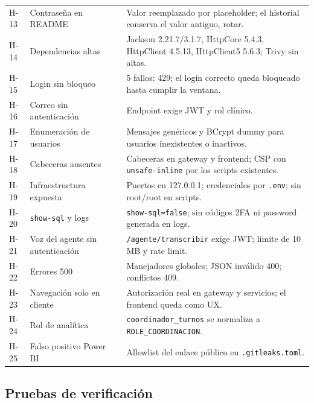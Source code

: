{\begin{longtable}{@{}L{1.0cm}L{5.2cm}L{2.2cm}L{7.0cm}@{}}
H-13 & Contraseña en README &  & Valor reemplazado por placeholder; el historial conserva el valor antiguo, rotar.\\
H-14 & Dependencias altas &  & Jackson 2.21.7/3.1.7, HttpCore 5.4.3, HttpClient 4.5.13, HttpClient5 5.6.3; Trivy sin altas.\\
H-15 & Login sin bloqueo &  & 5 fallos: 429; el login correcto queda bloqueado hasta cumplir la ventana.\\
H-16 & Correo sin autenticación &  & Endpoint exige JWT y rol clínico.\\
H-17 & Enumeración de usuarios &  & Mensajes genéricos y BCrypt dummy para usuarios inexistentes o inactivos.\\
H-18 & Cabeceras ausentes &  & Cabeceras en gateway y frontend; CSP con \texttt{unsafe-inline} por los scripts existentes.\\
H-19 & Infraestructura expuesta &  & Puertos en 127.0.0.1; credenciales por \texttt{.env}; sin root/root en scripts.\\
H-20 & \texttt{show-sql} y logs &  & \texttt{show-sql=false}; sin códigos 2FA ni password generada en logs.\\
H-21 & Voz del agente sin autenticación &  & \texttt{/agente/transcribir} exige JWT; límite de 10 MB y rate limit.\\
H-22 & Errores 500 &  & Manejadores globales; JSON inválido 400; conflictos 409.\\
H-23 & Navegación solo en cliente &  & Autorización real en gateway y servicios; el frontend queda como UX.\\
H-24 & Rol de analítica &  & \texttt{coordinador\_turnos} se normaliza a \texttt{ROLE\_COORDINACION}.\\
H-25 & Falso positivo Power BI &  & Allowlist del enlace público en \texttt{.gitleaks.toml}.\\
\end{longtable}
}

\subsection{Pruebas de verificación}

